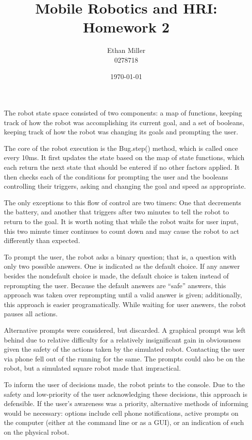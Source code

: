 \documentclass[12pt]{article}
\title{Mobile Robotics and HRI: Homework 2}
\author{Ethan Miller\\0278718}
\date{\today}
\begin{document}
\maketitle

The robot state space consisted of two components: a map of functions, keeping
track of how the robot was accomplishing its current goal, and a set of booleans,
keeping track of how the robot was changing its goals and prompting the user.

The core of the robot execution is the Bug.step() method, which is called once
every 10ms. It first updates the state based on the map of state functions, which
each return the next state that should be entered if no other factors applied. It
then checks each of the conditions for prompting the user and the booleans
controlling their triggers, asking and changing the goal and speed as appropriate.

The only exceptions to this flow of control are two timers: One that decrements
the battery, and another that triggers after two minutes to tell the robot to
return to the goal. It is worth noting that while the robot waits for user input,
this two minute timer continues to count down and may cause the robot to act
differently than expected.

To prompt the user, the robot asks a binary question; that is, a question with
only two possible answers. One is indicated as the default choice. If any answer
besides the nondefault choice is made, the default choice is taken instead of
reprompting the user. Because the default answers are ``safe'' answers, this
approach was taken over reprompting until a valid answer is given; additionally,
this approach is easier programatically. While waiting for user answers, the
robot pauses all actions.

Alternative prompts were considered, but discarded. A graphical prompt was
left behind due to relative difficulty for a relatively insignificant gain in
obviousness given the safety of the actions taken by the simulated robot.
Contacting the user via phone fell out of the running for the same. The prompts
could also be on the robot, but a simulated square robot made that impractical.

To inform the user of decisions made, the robot prints to the console. Due to the
safety and low-priority of the user acknowledging these decisions, this approach
is defensible. If the user's awareness was a priority, alternative methods of
informing would be necessary: options include cell phone notifications, active
prompts on the computer (either at the command line or as a GUI), or an indication
of such on the physical robot.
\end{document}
